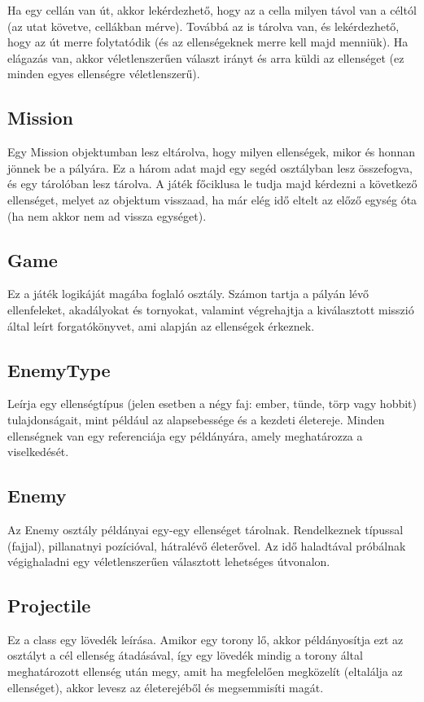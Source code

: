 Ha egy cellán van út, akkor lekérdezhető, hogy az a cella milyen távol van a céltól (az utat követve, cellákban mérve). Továbbá az is tárolva van, és lekérdezhető, hogy az út merre folytatódik (és az ellenségeknek merre kell majd menniük). Ha elágazás van, akkor véletlenszerűen választ irányt és arra küldi az ellenséget (ez minden egyes ellenségre véletlenszerű).

\subsection{Mission}
Egy Mission objektumban lesz eltárolva, hogy milyen ellenségek, mikor és honnan jönnek be a pályára. Ez a három adat majd egy segéd osztályban lesz összefogva, és egy tárolóban lesz tárolva. A játék főciklusa le tudja majd kérdezni a következő ellenséget, melyet az objektum visszaad, ha már elég idő eltelt az előző egység óta (ha nem akkor nem ad vissza egységet).

\subsection{Game}
Ez a játék logikáját magába foglaló osztály. Számon tartja a pályán lévő ellenfeleket, akadályokat és tornyokat, valamint végrehajtja a kiválasztott misszió által leírt forgatókönyvet, ami alapján az ellenségek érkeznek.

\subsection{EnemyType}
Leírja egy ellenségtípus (jelen esetben a négy faj: ember, tünde, törp vagy hobbit) tulajdonságait, mint például az alapsebessége és a kezdeti életereje. Minden ellenségnek van egy referenciája egy példányára, amely meghatározza a viselkedését.

\subsection{Enemy}
Az Enemy osztály példányai egy-egy ellenséget tárolnak. Rendelkeznek típussal (fajjal), pillanatnyi pozícióval, hátralévő életerővel. Az idő haladtával próbálnak végighaladni egy véletlenszerűen választott lehetséges útvonalon.

\subsection{Projectile}
Ez a class egy lövedék leírása. Amikor egy torony lő, akkor példányosítja ezt az osztályt a cél ellenség átadásával, így egy lövedék mindig a torony által meghatározott ellenség után megy, amit ha megfelelően megközelít (eltalálja az ellenséget), akkor levesz az életerejéből és megsemmisíti magát.



